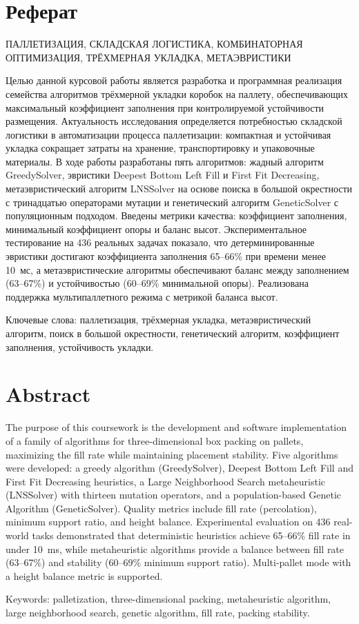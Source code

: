 \chapter*{Реферат}
ПАЛЛЕТИЗАЦИЯ, СКЛАДСКАЯ ЛОГИСТИКА, КОМБИНАТОРНАЯ ОПТИМИЗАЦИЯ, ТРЁХМЕРНАЯ УКЛАДКА, МЕТАЭВРИСТИКИ

Целью данной курсовой работы является разработка и программная реализация семейства алгоритмов трёхмерной укладки коробок на паллету, обеспечивающих максимальный коэффициент заполнения при контролируемой устойчивости размещения. Актуальность исследования определяется потребностью складской логистики в автоматизации процесса паллетизации: компактная и устойчивая укладка сокращает затраты на хранение, транспортировку и упаковочные материалы. В ходе работы разработаны пять алгоритмов: жадный алгоритм GreedySolver, эвристики Deepest Bottom Left Fill и First Fit Decreasing, метаэвристический алгоритм LNSSolver на основе поиска в большой окрестности с тринадцатью операторами мутации и генетический алгоритм GeneticSolver с популяционным подходом. Введены метрики качества: коэффициент заполнения, минимальный коэффициент опоры и баланс высот. Экспериментальное тестирование на 436 реальных задачах показало, что детерминированные эвристики достигают коэффициента заполнения 65--66\% при времени менее 10~мс, а метаэвристические алгоритмы обеспечивают баланс между заполнением (63--67\%) и устойчивостью (60--69\% минимальной опоры). Реализована поддержка мультипаллетного режима с метрикой баланса высот.

Ключевые слова: паллетизация, трёхмерная укладка, метаэвристический алгоритм, поиск в большой окрестности, генетический алгоритм, коэффициент заполнения, устойчивость укладки.


\chapter*{Abstract}
The purpose of this coursework is the development and software implementation of a family of algorithms for three-dimensional box packing on pallets, maximizing the fill rate while maintaining placement stability. Five algorithms were developed: a greedy algorithm (GreedySolver), Deepest Bottom Left Fill and First Fit Decreasing heuristics, a Large Neighborhood Search metaheuristic (LNSSolver) with thirteen mutation operators, and a population-based Genetic Algorithm (GeneticSolver). Quality metrics include fill rate (percolation), minimum support ratio, and height balance. Experimental evaluation on 436 real-world tasks demonstrated that deterministic heuristics achieve 65--66\% fill rate in under 10~ms, while metaheuristic algorithms provide a balance between fill rate (63--67\%) and stability (60--69\% minimum support ratio). Multi-pallet mode with a height balance metric is supported.

Keywords: palletization, three-dimensional packing, metaheuristic algorithm, large neighborhood search, genetic algorithm, fill rate, packing stability.

\pagestyle{plain}

